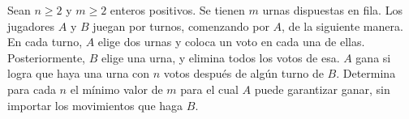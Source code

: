 Sean $n \geq 2$ y $m \geq 2$ enteros positivos. Se tienen $m$ urnas dispuestas en fila. Los jugadores
$A$ y $B$ juegan por turnos, comenzando por $A$, de la siguiente manera. En cada turno, $A$
elige dos urnas y coloca un voto en cada una de ellas. Posteriormente, $B$ elige una urna,
y elimina todos los votos de esa. $A$ gana si logra que haya una urna con $n$ votos después
de algún turno de $B$. Determina para cada $n$ el mínimo valor de $m$ para el cual $A$ puede
garantizar ganar, sin importar los movimientos que haga $B$.